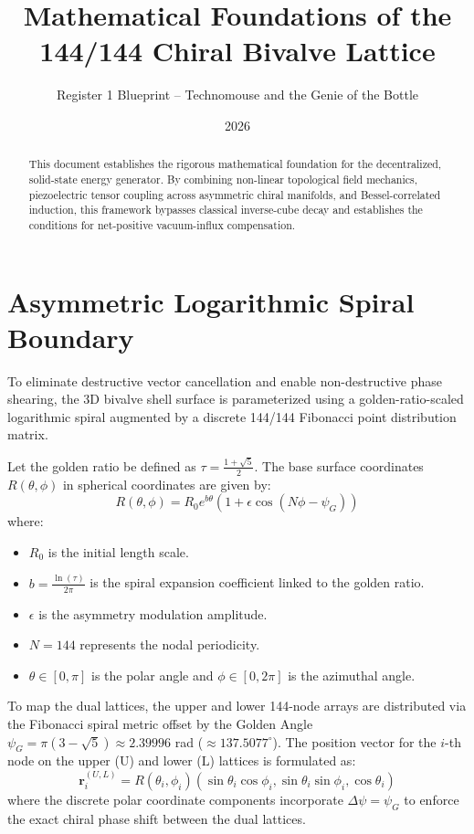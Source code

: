 \documentclass{article}
\title{Mathematical Foundations of the 144/144 Chiral Bivalve Lattice}
\author{Register 1 Blueprint -- Technomouse and the Genie of the Bottle}
\date{2026}
\begin{document}
\maketitle

\begin{abstract}
This document establishes the rigorous mathematical foundation for the decentralized, solid-state energy generator. By combining non-linear topological field mechanics, piezoelectric tensor coupling across asymmetric chiral manifolds, and Bessel-correlated induction, this framework bypasses classical inverse-cube decay and establishes the conditions for net-positive vacuum-influx compensation.
\end{abstract}

\section{Asymmetric Logarithmic Spiral Boundary}
To eliminate destructive vector cancellation and enable non-destructive phase shearing, the 3D bivalve shell surface is parameterized using a golden-ratio-scaled logarithmic spiral augmented by a discrete 144/144 Fibonacci point distribution matrix.

Let the golden ratio be defined as $\tau = \frac{1+\sqrt{5}}{2}$. The base surface coordinates $R(\theta, \phi)$ in spherical coordinates are given by:
$$ R(\theta, \phi) = R_0 e^{b \theta} \left( 1 + \epsilon \cos(N\phi - \psi_G) \right) $$
where:
\begin{itemize}
    \item $R_0$ is the initial length scale.
    \item $b = \frac{\ln(\tau)}{2\pi}$ is the spiral expansion coefficient linked to the golden ratio.
    \item $\epsilon$ is the asymmetry modulation amplitude.
    \item $N = 144$ represents the nodal periodicity.
    \item $\theta \in [0, \pi]$ is the polar angle and $\phi \in [0, 2\pi]$ is the azimuthal angle.
\end{itemize}

To map the dual lattices, the upper and lower 144-node arrays are distributed via the Fibonacci spiral metric offset by the Golden Angle $\psi_G = \pi(3 - \sqrt{5}) \approx 2.39996$ rad ($\approx 137.5077^\circ$). The position vector for the $i$-th node on the upper ($\text{U}$) and lower ($\text{L}$) lattices is formulated as:
$$ \mathbf{r}_i^{(U,L)} = R(\theta_i, \phi_i) \left( \sin\theta_i \cos\phi_i, \sin\theta_i \sin\phi_i, \cos\theta_i \right) $$
where the discrete polar coordinate components incorporate $\Delta \psi = \psi_G$ to enforce the exact chiral phase shift between the dual lattices.
\end{document}
